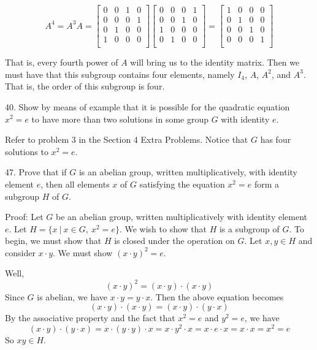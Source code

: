 \documentclass{article}
\begin{document}
\[A^4 = A^3A = 
\begin{bmatrix}
    0 & 0 & 1 & 0\\
    0 & 0 & 0 & 1\\
    0 & 1 & 0 & 0\\
    1 & 0 & 0 & 0\\
\end{bmatrix}
\begin{bmatrix}
    0 & 0 & 0 & 1\\
    0 & 0 & 1 & 0\\
    1 & 0 & 0 & 0\\
    0 & 1 & 0 & 0\\
\end{bmatrix}
=
\begin{bmatrix}
    1 & 0 & 0 & 0\\
    0 & 1 & 0 & 0\\
    0 & 0 & 1 & 0\\
    0 & 0 & 0 & 1\\
\end{bmatrix}\]

That is, every fourth power of $A$ will bring us to the identity matrix. Then we must have that this subgroup contains four elements, namely $I_4$, $A$, $A^2$, and $A^3$. That is, the order of this subgroup is four.
\newline

40. Show by means of example that it is possible for the quadratic equation $x^2 = e$ to have more than two solutions in some group $G$ with identity $e$.
\newline

Refer to problem 3 in the Section 4 Extra Problems. Notice that $G$ has four solutions to $x^2 = e$.
\newline

47. Prove that if $G$ is an abelian group, written multiplicatively, with identity element $e$, then all elements $x$ of $G$ satisfying the equation $x^2 = e$ form a subgroup $H$ of $G$.
\newline

Proof: Let $G$ be an abelian group, written multiplicatively with identity element $e$. Let $H = \{x \: | \: x \in G, \: x^2 = e\}$. We wish to show that $H$ is a subgroup of $G$. To begin, we must show that $H$ is closed under the operation on $G$. Let $x, y \in H$ and consider $x \cdot y$. We must show $(x \cdot y)^2 = e$.
\newline

Well,
\[(x \cdot y)^2 = (x \cdot y) \cdot (x \cdot y)\]
Since $G$ is abelian, we have $x \cdot y = y \cdot x$. Then the above equation becomes
\[(x \cdot y) \cdot (x \cdot y) = (x \cdot y) \cdot (y \cdot x)\]
By the associative property and the fact that $x^2 = e$ and $y^2 = e$, we have
\[ (x \cdot y) \cdot (y \cdot x)= x \cdot (y \cdot y) \cdot x = x\cdot y^2 \cdot x = x \cdot e \cdot x = x \cdot x = x^2 = e\]
So $xy \in H$.
\newline
\end{document}
